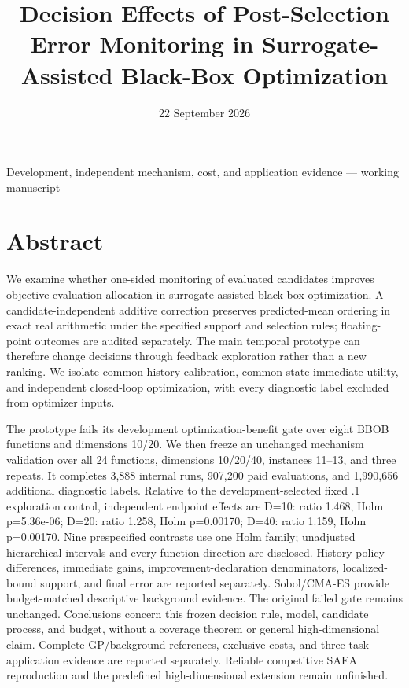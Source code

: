 \documentclass[11pt,a4paper]{article}
\title{Decision Effects of Post-Selection Error Monitoring in
Surrogate-Assisted Black-Box Optimization}
\author{}
\date{22 September 2026}
\begin{document}
\maketitle
\begin{center}Development, independent mechanism, cost, and application
evidence --- working manuscript\end{center}
\hypertarget{abstract}{%
\section{Abstract}\label{abstract}}

We examine whether one-sided monitoring of evaluated candidates improves
objective-evaluation allocation in surrogate-assisted black-box
optimization. A candidate-independent additive correction preserves
predicted-mean ordering in exact real arithmetic under the specified
support and selection rules; floating-point outcomes are audited
separately. The main temporal prototype can therefore change decisions
through feedback exploration rather than a new ranking. We isolate
common-history calibration, common-state immediate utility, and
independent closed-loop optimization, with every diagnostic label
excluded from optimizer inputs.

The prototype fails its development optimization-benefit gate over eight
BBOB functions and dimensions 10/20. We then freeze an unchanged
mechanism validation over all 24 functions, dimensions 10/20/40,
instances 11--13, and three repeats. It completes 3,888 internal runs,
907,200 paid evaluations, and 1,990,656 additional diagnostic labels.
Relative to the development-selected fixed .1 exploration control,
independent endpoint effects are D=10: ratio 1.468, Holm p=5.36e-06;
D=20: ratio 1.258, Holm p=0.00170; D=40: ratio 1.159, Holm p=0.00170.
Nine prespecified contrasts use one Holm family; unadjusted hierarchical
intervals and every function direction are disclosed. History-policy
differences, immediate gains, improvement-declaration denominators,
localized-bound support, and final error are reported separately.
Sobol/CMA-ES provide budget-matched descriptive background evidence. The
original failed gate remains unchanged. Conclusions concern this frozen
decision rule, model, candidate process, and budget, without a coverage
theorem or general high-dimensional claim. Complete GP/background
references, exclusive costs, and three-task application evidence are
reported separately. Reliable competitive SAEA reproduction and the
predefined high-dimensional extension remain unfinished.
\end{document}
